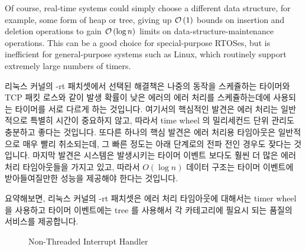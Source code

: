 Of course, real-time systems could simply choose a different data
structure, for example, some form of heap or tree, giving up
$\mathcal{O}\left(1\right)$ bounds on insertion and deletion operations to gain $\mathcal{O}\left(\log n\right)$
limits on data-structure-maintenance operations.
This can be a good choice for special-purpose RTOSes, but is inefficient
for general-purpose systems such as Linux, which routinely support
extremely large numbers of timers.
\fi

리눅스 커널의 -rt 패치셋에서 선택된 해결책은 나중의 동작을 스케쥴하는 타이머와
TCP 패킷 로스와 같이 발생 확률이 낮은 에러의 에러 처리를 스케쥴하는데에
사용되는 타이머를 서로 다르게 하는 것입니다.
여기서의 핵심적인 발견은 에러 처리는 일반적으로 특별히 시간이 중요하지 않고,
따라서 time wheel 의 밀리세컨드 단위 관리도 충분하고 좋다는 것입니다.
또다른 하나의 핵심 발견은 에러 처리용 타임아웃은 일반적으로 매우 빨리
취소되는데, 그 빠른 정도는 아래 단계로의 전파 전인 경우도 잦다는 것입니다.
마지막 발견은 시스템은 발생시키는 타이머 이벤트 보다도 훨씬 더 많은 에러 처리
타임아웃들을 가지고 있고, 따라서 $O(\log n)$ 데이터 구조는 타이머 이벤트에
받아들여질만한 성능을 제공해야 한다는 것입니다.

요약해보면, 리눅스 커널의 -rt 패치셋은 에러 처리 타임아웃에 대해서는 timer
wheel 을 사용하고 타이머 이벤트에는 tree 를 사용해서 각 카테고리에 필요시 되는
품질의 서비스를 제공합니다.

\begin{figure}[tb]
\centering
{}
\caption{Non-Threaded Interrupt Handler}
\label{fig:advsync:Non-Threaded Interrupt Handler}
\end{figure}

